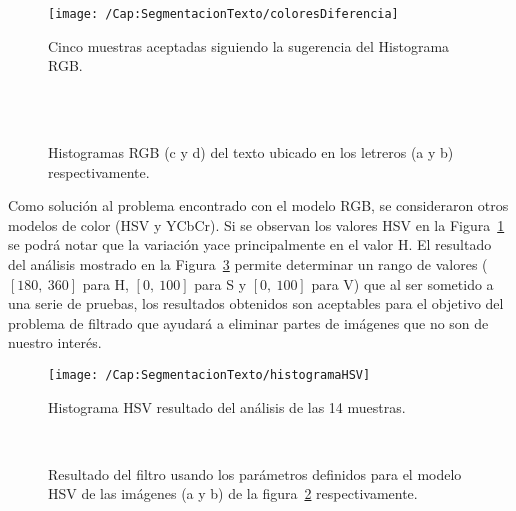 \begin{figure}[h!]
	\centering
	\texttt{[image: /Cap:SegmentacionTexto/coloresDiferencia]}
	\caption{Cinco muestras aceptadas siguiendo la sugerencia del Histograma RGB.}
	\label{Fig:Cap-segmentaciontexto:coloresDiferencia}
\end{figure}

\begin{figure}[h!]
	\centering
	 { }	
	 { }\\
	 { }
   \\
	\caption{Histogramas RGB (c y d) del texto ubicado en los letreros (a y b) respectivamente.}
	\label{Fig:Cap-segmentaciontexto:errorRGB}
\end{figure}

Como solución al problema encontrado con el modelo RGB, se consideraron otros
modelos de color (HSV y YCbCr). Si se observan los valores HSV en la
Figura~\ref{Fig:Cap-segmentaciontexto:coloresDiferencia} se podrá notar que la
variación yace principalmente en el valor H. El resultado del análisis mostrado
en la Figura~\ref{Fig:Cap-segmentaciontexto:HistogramaHSV} permite determinar un
rango de valores ($[180,~360]$ para H, $[0,~100]$ para S y $[0,~100]$ para V)
que al ser sometido a una serie de pruebas, los resultados obtenidos son
aceptables para el objetivo del problema de filtrado que ayudará a eliminar
partes de imágenes que no son de nuestro interés.

\begin{figure}[h!]
	\texttt{[image: /Cap:SegmentacionTexto/histogramaHSV]}
	\caption{Histograma HSV resultado del análisis de las 14 muestras.}
	\label{Fig:Cap-segmentaciontexto:HistogramaHSV}
\end{figure}

\begin{figure}[h!]
	\centering
   { }
   \\
	\caption{Resultado del filtro usando los parámetros definidos para el modelo
	HSV de las imágenes (a y b) de la 
	figura~\ref{Fig:Cap-segmentaciontexto:errorRGB} respectivamente.}
	\label{Fig:Cap-segmentaciontexto:filtroAdHocHSV}
\end{figure}


